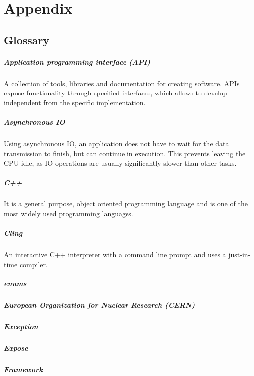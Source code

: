 \chapter{Appendix}
\section{Glossary}
\paragraph{Application programming interface (API)}
A collection of tools, libraries and documentation for creating software. APIs expose functionality through specified interfaces, which allows to develop independent from the specific implementation.
\paragraph{Asynchronous IO}
Using asynchronous IO, an application does not have to wait for the data transmission to finish, but can continue in execution. This prevents leaving the CPU idle, as IO operations are usually significantly slower than other tasks.
\paragraph{C++}
It is a general purpose, object oriented programming language and is one of the most widely used programming languages.
\paragraph{Cling}
An interactive C++ interpreter with a command line prompt and uses a just-in-time compiler.
\paragraph{enums}
\paragraph{European Organization for Nuclear Research (CERN)}
\paragraph{Exception}
\paragraph{Expose}
\paragraph{Framework}
